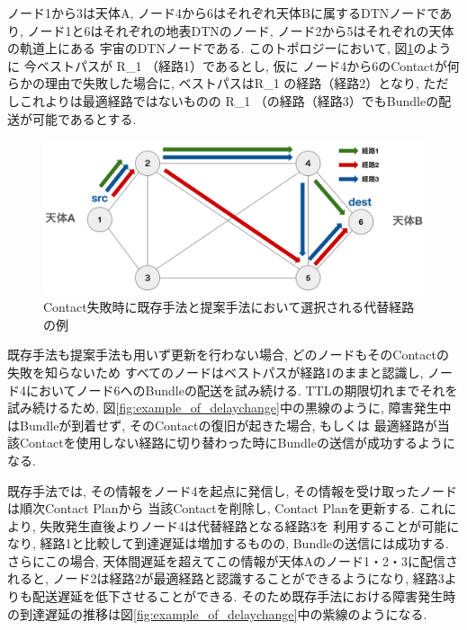 ノード1から3は天体A, ノード4から6はそれぞれ天体Bに属するDTNノードであり, 
ノード1と6はそれぞれの地表DTNのノード, ノード2から5はそれぞれの天体の軌道上にある
宇宙のDTNノードである. 
このトポロジーにおいて, 図\ref{fig:example_of_routechange}のように
今ベストパスが R_{1   }（経路1）であるとし, 仮に
ノード4から6のContactが何らかの理由で失敗した場合に, 
ベストパスはR_{1   }の経路（経路2）となり, 
ただしこれよりは最適経路ではないものの
R_{1    }（の経路（経路3）でもBundleの配送が可能であるとする.

\begin{figure}[tbh]
    \centering
    \includegraphics[width=0.7\textheight]{img/example_of_routechange.pdf}
    \caption{Contact失敗時に既存手法と提案手法において選択される代替経路の例}
    \label{fig:example_of_routechange}
\end{figure}

既存手法も提案手法も用いず更新を行わない場合, どのノードもそのContactの失敗を知らないため
すべてのノードはベストパスが経路1のままと認識し, ノード4においてノード6へのBundleの配送を試み続ける.
TTLの期限切れまでそれを試み続けるため, 図\ref{fig:example_of_delaychange}中の黒線のように, 
障害発生中はBundleが到着せず, そのContactの復旧が起きた場合, もしくは
最適経路が当該Contactを使用しない経路に切り替わった時にBundleの送信が成功するようになる. 

既存手法では, その情報をノード4を起点に発信し, その情報を受け取ったノードは順次Contact Planから
当該Contactを削除し, Contact Planを更新する. これにより, 失敗発生直後よりノード4は代替経路となる経路3を
利用することが可能になり, 経路1と比較して到達遅延は増加するものの, Bundleの送信には成功する. さらにこの場合, 
天体間遅延を超えてこの情報が天体Aのノード1・2・3に配信されると, 
ノード2は経路2が最適経路と認識することができるようになり, 経路3よりも配送遅延を低下させることができる. 
そのため既存手法における障害発生時の到達遅延の推移は図\ref{fig:example_of_delaychange}中の紫線のようになる. 

